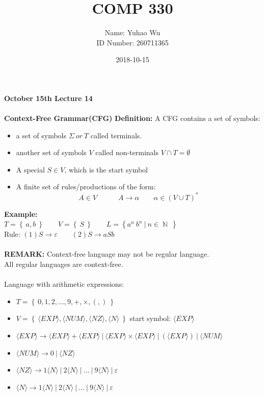 \documentclass[11pt]{article}
\newcommand{\curbrak}[1]{\left\{ #1 \right\}}
\newcommand{\lrangle}[1]{\langle #1 \rangle}
\DeclareMathOperator{\N}{\mathbb{N}}
\begin{document}
\title{COMP 330}
\date{2018-10-15}
\author{Name: Yuhao Wu\\
ID Number: 260711365
}
\maketitle
	\bigskip

\textbf{October 15th Lecture 14}\\
\\
\textbf{Context-Free Grammar(CFG)}
\textbf{Definition:} A CFG contains a set of symbols:
\begin{itemize}
	\item a set of symbols $\Sigma \ or\ T$ called terminals.
	\item another set of symbols $V$ called non-terminals \quad $V \cap T = \emptyset $
	\item A special $S \in V$, which is the start symbol
	\item A finite set of rules/productions of the form:
	$$ A \in V\quad \quad \quad A \to \alpha \quad \quad \alpha \in (V \cup T)^*$$
\end{itemize}
\textbf{Example:}\\
$T = \curbrak{\ a, b\ } \quad \quad V = \curbrak{\ S\ } \quad \quad L = \curbrak{a^n\ b^n \ |\ n \in \N \ }$\\
Rule: $(1) S\to \varepsilon \quad\quad (2) S \to a S b$
\\
\\
\textbf{REMARK:} Context-free language may not be regular language.\\
All regular languages are context-free.\\
\\
Language with arithmetic expressions:\\
\begin{itemize}
	\item $T = \curbrak{\ 0, 1, 2, \ldots , 9, + , \times , (, ) \ }$
	\item $V = \curbrak{\  \lrangle{EXP}, \lrangle{NUM}, \lrangle{NZ}, \lrangle{N}\ }$ \quad start symbol:  $\lrangle{EXP}$
	\item $\lrangle{EXP} \to \lrangle{EXP} + \lrangle{EXP} \ |\ \lrangle{EXP} \times \lrangle{EXP}\ |\ (\lrangle{EXP}  )\ |\ \lrangle{NUM}    $
	\item $ \lrangle{NUM} \to 0 \ |\ \lrangle{NZ} $
	\item $\lrangle{NZ} \to 1\lrangle{N}\ |\ 2\lrangle{N}\ |\ \ldots \ |\ 9\lrangle{N}\ |\ \varepsilon  $
	\item $\lrangle{N} \to 1\lrangle{N}\ |\ 2\lrangle{N}\ |\ \ldots \ |\ 9\lrangle{N}\ |\ \varepsilon  $
\end{itemize}
\end{document}

